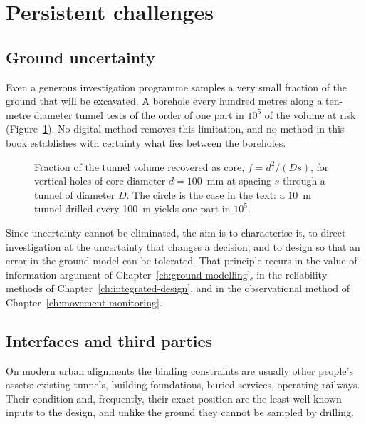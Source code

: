 \section{Persistent challenges}
\label{sec:persistent-challenges}

\subsection{Ground uncertainty}
\label{sec:uncertainty-challenge}

Even a generous investigation programme samples a very small fraction of the ground
that will be excavated. A borehole every hundred metres along a ten-metre
diameter tunnel tests of the order of one part in $10^{5}$ of the volume at
risk (Figure~\ref{fig:chal-sampling-fraction}). No digital method removes this limitation, and no method in this book establishes
with certainty what lies between the boreholes.

\begin{figure}[htbp]
\centering
{}
\caption{Fraction of the tunnel volume recovered as core, $f = d^2/(Ds)$, for
vertical holes of core diameter $d = 100$~mm at spacing $s$ through a tunnel
of diameter $D$. The circle is the case in the text: a 10~m tunnel drilled
every 100~m yields one part in $10^5$.}
\label{fig:chal-sampling-fraction}
\end{figure}

Since uncertainty cannot be eliminated, the aim is to
characterise it, to direct investigation at the uncertainty that changes a
decision, and to design so that an error in the ground model can be tolerated.
That principle recurs in the value-of-information argument of Chapter~\ref{ch:ground-modelling}, in
the reliability methods of Chapter~\ref{ch:integrated-design}, and in the
observational method of Chapter~\ref{ch:movement-monitoring}.

\subsection{Interfaces and third parties}
\label{sec:interfaces-challenge}

On modern urban alignments the binding constraints are usually other people's
assets: existing tunnels, building foundations, buried services, operating
railways. Their condition and, frequently, their exact position are the least
well known inputs to the design, and unlike the ground they cannot be sampled
by drilling.

